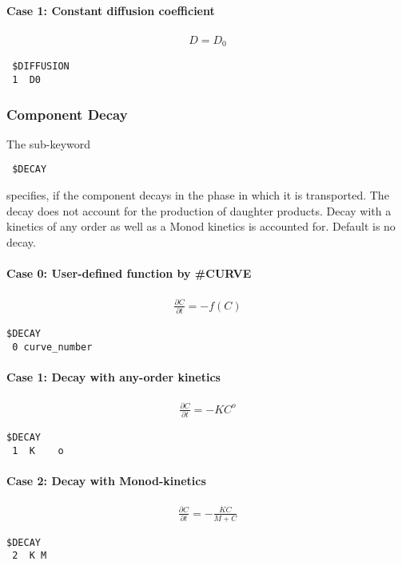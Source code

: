 \paragraph*{Case 1: Constant diffusion coefficient}
\begin{eqnarray}
    D =  D_0
\end{eqnarray}
\begin{verbatim}
 $DIFFUSION
 1  D0
\end{verbatim}

\subsubsection{Component Decay}
The sub-keyword
\begin{verbatim}
 $DECAY
\end{verbatim}
specifies, if the component decays in the phase in which it is transported. The decay does not account for the production of daughter products.
Decay with a kinetics of any order as well as a Monod kinetics is accounted for. Default is no decay.

\paragraph*{Case 0: User-defined function by \#CURVE}
\begin{eqnarray}
  \frac{\partial C}{\partial t} =  -f(C)
\end{eqnarray}
\begin{verbatim}
$DECAY
 0 curve_number
\end{verbatim}

\paragraph*{Case 1: Decay with any-order kinetics}
\begin{eqnarray}
  \frac{\partial C}{\partial t} =  - K C^o
\end{eqnarray}
\begin{verbatim}
$DECAY
 1  K    o
\end{verbatim}

\paragraph*{Case 2: Decay with Monod-kinetics}
\begin{eqnarray}
  \frac{\partial C}{\partial t} =  -\frac{ K C}{M + C}
\end{eqnarray}
\begin{verbatim}
$DECAY
 2  K M
\end{verbatim}


